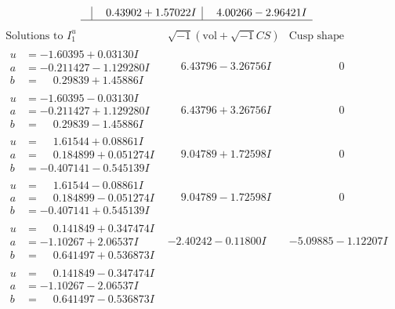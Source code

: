 \documentclass[1p]{elsarticle_modified}
\theoremstyle{definition}
\newcommand{\I}{\sqrt{-1}}
\begin{document}
$$\begin{array}{c|c|c}
 & \phantom{-}0.43902 + 1.57022 I & \phantom{-}4.00266 - 2.96421 I\\
 \hline 
 \end{array}$$\newpage$$\begin{array}{c|c|c}  
\text{Solutions to }I^u_{1}& \I (\text{vol} + \sqrt{-1}CS) & \text{Cusp shape}\\
 \hline 
\begin{aligned}
u &= -1.60395 + 0.03130 I \\
a &= -0.211427 - 1.129280 I \\
b &= \phantom{-}0.29839 + 1.45886 I\end{aligned}
 & \phantom{-}6.43796 - 3.26756 I & \phantom{-0.000000 } 0 \\ \hline\begin{aligned}
u &= -1.60395 - 0.03130 I \\
a &= -0.211427 + 1.129280 I \\
b &= \phantom{-}0.29839 - 1.45886 I\end{aligned}
 & \phantom{-}6.43796 + 3.26756 I & \phantom{-0.000000 } 0 \\ \hline\begin{aligned}
u &= \phantom{-}1.61544 + 0.08861 I \\
a &= \phantom{-}0.184899 + 0.051274 I \\
b &= -0.407141 - 0.545139 I\end{aligned}
 & \phantom{-}9.04789 + 1.72598 I & \phantom{-0.000000 } 0 \\ \hline\begin{aligned}
u &= \phantom{-}1.61544 - 0.08861 I \\
a &= \phantom{-}0.184899 - 0.051274 I \\
b &= -0.407141 + 0.545139 I\end{aligned}
 & \phantom{-}9.04789 - 1.72598 I & \phantom{-0.000000 } 0 \\ \hline\begin{aligned}
u &= \phantom{-}0.141849 + 0.347474 I \\
a &= -1.10267 + 2.06537 I \\
b &= \phantom{-}0.641497 + 0.536873 I\end{aligned}
 & -2.40242 - 0.11800 I & -5.09885 - 1.12207 I \\ \hline\begin{aligned}
u &= \phantom{-}0.141849 - 0.347474 I \\
a &= -1.10267 - 2.06537 I \\
b &= \phantom{-}0.641497 - 0.536873 I\end{aligned}

\end{array}$$
\end{document}
